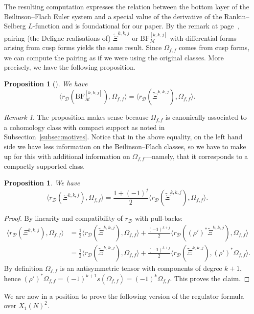 \documentclass[11pt, a4paper, reqno]{amsart}
\theoremstyle{definition}
\theoremstyle{plain}
\newtheorem{proposition}[definition]{Proposition}
\theoremstyle{remark}
\newtheorem*{remark}{Remark}
\DeclareMathOperator{\mot}{\mathscr{M}}
\newcommand{\BF}{\mathrm{BF}}
\newcommand{\lcBF}{\widetilde{\Xi}}
\newcommand{\cBF}{\Xi}
\newcommand{\del}{\mathcal{D}}
\newcommand{\regulator}[1]{r_{#1}}
\newcommand{\rD}{\regulator{\del}}
\begin{document}
The resulting computation expresses the relation between the bottom layer of the Beilinson--Flach Euler system and a special value of the derivative of the Rankin--Selberg $L$-function and is foundational for our paper. By the remark at page~\pageref{rmk:pairing-unchanged}, pairing (the Deligne realisations of) $\lcBF^{k,k,j}$ or $\BF^{[k,k,j]}_{\mot}$ with differential forms arising from cusp forms yields the same result. Since $\Omega_{f,f}$ comes from cusp forms, we can compute the pairing as if we were using the original classes. More precisely, we have the following proposition.
\begin{proposition}[{\cite[Proposition~9.4]{brunaultchida16}}]
    \label{prop:brunault-chida-pairing}
    We have
    \[
        \langle \rD(\BF^{[k,k,j]}_{\mot}),\Omega_{f,f} \rangle = \langle \rD(\lcBF^{k,k,j}),\Omega_{f,f} \rangle.
    \]
\end{proposition}
\begin{remark}
    The proposition makes sense because $\Omega_{f,f}$ is canonically associated to a cohomology class with compact support as noted in Subsection~\ref{subsec:motives}. Notice that in the above equality, on the left hand side we have less information on the Beilinson--Flach classes, so we have to make up for this with additional information on $\Omega_{f,f}$---namely, that it corresponds to a compactly supported class.
\end{remark}
\begin{proposition}
    We have
    \[
        \langle \rD(\cBF^{k,k,j}),\Omega_{f,f} \rangle = \frac{1+(-1)^j}{2}\langle \rD(\lcBF^{k,k,j}),\Omega_{f,f} \rangle.
    \]
\end{proposition}
\begin{proof}
    By linearity and compatibility of $\rD$ with pull-backs:
    \begin{align*}
        \langle \rD(\cBF^{k,k,j}),\Omega_{f,f} \rangle &= \frac{1}{2}\langle \rD(\lcBF^{k,k,j}),\Omega_{f,f} \rangle + \frac{(-1)^{k+j}}{2}\langle \rD((\rho')^*\lcBF^{k,k,j}),\Omega_{f,f} \rangle \\
        &= \frac{1}{2}\langle \rD(\lcBF^{k,k,j}),\Omega_{f,f} \rangle + \frac{(-1)^{k+j}}{2}\langle \rD(\lcBF^{k,k,j}),(\rho')^*\Omega_{f,f} \rangle.
    \end{align*}
    By definition $\Omega_{f,f}$ is an antisymmetric tensor with components of degree $k+1$, hence $(\rho')^*\Omega_{f,f} = (-1)^{k+1}s(\Omega_{f,f}) = (-1)^k\Omega_{f,f}$. This proves the claim.
\end{proof}
We are now in a position to prove the following version of the regulator formula over $X_1(N)^2$.
\end{document}
